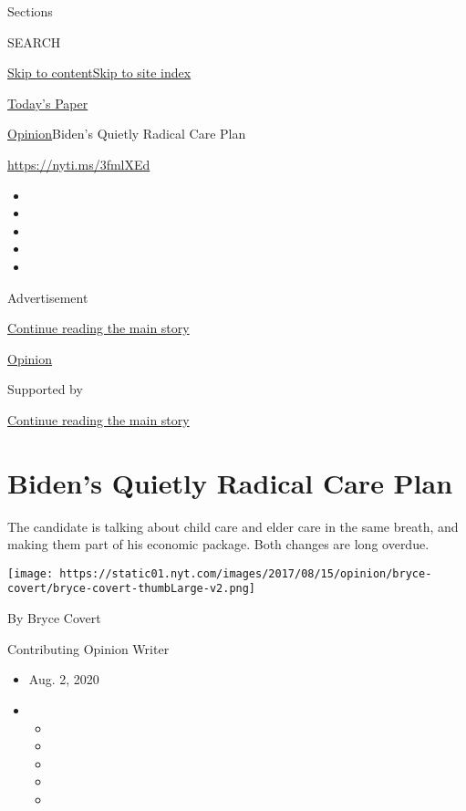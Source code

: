 Sections

SEARCH

\protect\hyperlink{site-content}{Skip to
content}\protect\hyperlink{site-index}{Skip to site index}

\href{https://myaccount.nytimes.com/auth/login?response_type=cookie\&client_id=vi}{}

\href{https://www.nytimes.com/section/todayspaper}{Today's Paper}

\href{/section/opinion}{Opinion}\textbar{}Biden's Quietly Radical Care
Plan

\url{https://nyti.ms/3fmlXEd}

\begin{itemize}
\item
\item
\item
\item
\item
\end{itemize}

Advertisement

\protect\hyperlink{after-top}{Continue reading the main story}

\href{/section/opinion}{Opinion}

Supported by

\protect\hyperlink{after-sponsor}{Continue reading the main story}

\hypertarget{bidens-quietly-radical-care-plan}{%
\section{Biden's Quietly Radical Care
Plan}\label{bidens-quietly-radical-care-plan}}

The candidate is talking about child care and elder care in the same
breath, and making them part of his economic package. Both changes are
long overdue.

\texttt{[image: https://static01.nyt.com/images/2017/08/15/opinion/bryce-covert/bryce-covert-thumbLarge-v2.png]}

By Bryce Covert

Contributing Opinion Writer

\begin{itemize}
\item
  Aug. 2, 2020
\item
  \begin{itemize}
  \item
  \item
  \item
  \item
  \item
  \end{itemize}
\end{itemize}


